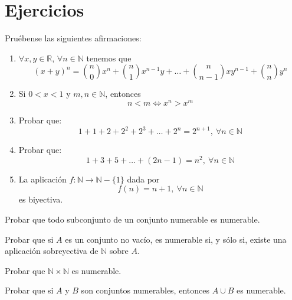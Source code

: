 \section{Ejercicios}
\begin{ejercicio} Pruébense las siguientes afirmaciones:
    \begin{enumerate}
        \item $\forall x,y \in \mathbb{R}$, $\forall n \in \mathbb{N}$ tenemos que
        \begin{equation*}
            (x+y)^n=\binom{n}{0}x^n+\binom{n}{1}x^{n-1}y+\dots+\binom{n}{n-1}x y^{n-1} + \binom{n}{n}y^n
        \end{equation*}

        \item Si $0 < x < 1$ y $m,n \in \mathbb{N}$, entonces
        \begin{equation*}
            n < m \Longleftrightarrow x^n > x^m
        \end{equation*}

        \item Probar que:
        \begin{equation*}
            1+1+2+2^2+2^3+\dots+2^n=2^{n+1}, ~\forall n \in \mathbb{N}
        \end{equation*}

        \item Probar que:
        \begin{equation*}
            1+3+5+\dots+(2n-1)=n^2, ~\forall n \in \mathbb{N}
        \end{equation*}

        \item La aplicación $f:\mathbb{N} \longrightarrow \mathbb{N}-\{1\}$ dada por
        \begin{equation*}
            f(n)=n+1,~\forall n \in \mathbb{N}
        \end{equation*}
        es biyectiva.
    \end{enumerate}
\end{ejercicio}


\begin{ejercicio}
    Probar que todo subconjunto de un conjunto numerable es numerable.
\end{ejercicio}

\begin{ejercicio}\label{ej:2.5.3}
    Probar que si $A$ es un conjunto no vacío, es numerable si, y sólo si, existe una aplicación sobreyectiva de $\mathbb{N}$ sobre $A$.
\end{ejercicio}

\begin{ejercicio}\label{ej:2.5.4}
    Probar que $\mathbb{N} \times \mathbb{N}$ es numerable.
\end{ejercicio}

\begin{ejercicio}
    Probar que si $A$ y $B$ son conjuntos numerables, entonces $A \cup B$ es numerable.
\end{ejercicio}